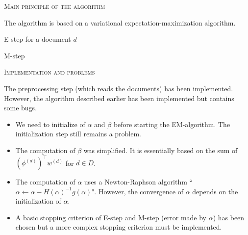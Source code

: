 \documentclass[10pt]{article}
\begin{document}
\begin{center}
\textsc{\Large{Main principle of the algorithm}}
\end{center}

The algorithm is based on a variational expectation-maximization algorithm.

\begin{algorithm}
\caption{E-step for a document $d$}
\end{algorithm}

\begin{algorithm}
\caption{M-step}
\end{algorithm}

\begin{center}
\textsc{\Large{Implementation and problems}}
\end{center}

The preprocessing step (which reads the documents) has been implemented. However, the algorithm described earlier has been implemented but contains some bugs.
\begin{itemize}
\setlength\itemsep{-0.2em}
  \item We need to initialize of $\alpha$ and $\beta$ before starting the EM-algorithm. The initialization step still remains a problem.
  \item The computation of $\beta$ was simplified. It is essentially based on the sum of $(\phi^{(d)})^{\top}w^{(d)}$ for $d \in D$.
  \item The computation of $\alpha$ uses a Newton-Raphson algorithm ``$\alpha \leftarrow \alpha - H(\alpha)^{-1}g(\alpha)$". However, the convergence of $\alpha$ depends on the initialization of $\alpha$.
  \item A basic stopping criterion of E-step and M-step (error made by $\alpha$) has been chosen but a more complex stopping criterion must be implemented.
\end{itemize}
\end{document}
